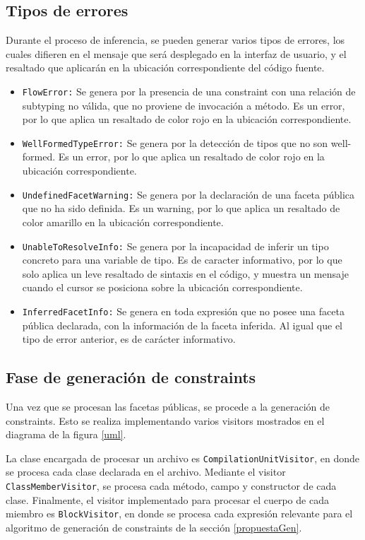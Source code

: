 \subsection{Tipos de errores}
Durante el proceso de inferencia, se pueden generar varios tipos de errores, los cuales difieren en el mensaje que será desplegado en la interfaz de usuario, y el resaltado que aplicarán en la ubicación correspondiente del código fuente.

\begin{itemize}
  \item \texttt{FlowError:} Se genera por la presencia de una constraint con una relación de subtyping no válida, que no proviene de invocación a método. Es un error, por lo que aplica un resaltado de color rojo en la ubicación correspondiente.
  \item \texttt{WellFormedTypeError:} Se genera por la detección de tipos que no son well-formed. Es un error, por lo que aplica un resaltado de color rojo en la ubicación correspondiente.
  \item \texttt{UndefinedFacetWarning:} Se genera por la declaración de una faceta pública que no ha sido definida. Es un warning, por lo que aplica un resaltado de color amarillo en la ubicación correspondiente.
  \item \texttt{UnableToResolveInfo:} Se genera por la incapacidad de inferir un tipo concreto para una variable de tipo. Es de caracter informativo, por lo que solo aplica un leve resaltado de sintaxis en el código, y muestra un mensaje cuando el cursor se posiciona sobre la ubicación correspondiente.
  \item \texttt{InferredFacetInfo:} Se genera en toda expresión que no posee una faceta pública declarada, con la información de la faceta inferida. Al igual que el tipo de error anterior, es de carácter informativo.
\end{itemize}

\subsection{Fase de generación de constraints}
Una vez que se procesan las facetas públicas, se procede a la generación de constraints. Esto se realiza implementando varios visitors mostrados en el diagrama de la figura \ref{uml}.

La clase encargada de procesar un archivo es \texttt{CompilationUnitVisitor}, en donde se procesa cada clase declarada en el archivo. Mediante el visitor \texttt{ClassMemberVisitor}, se procesa cada método, campo y constructor de cada clase. Finalmente, el visitor implementado para procesar el cuerpo de cada miembro es \texttt{BlockVisitor}, en donde se procesa cada expresión relevante para el algoritmo de generación de constraints de la sección \ref{propuestaGen}.

